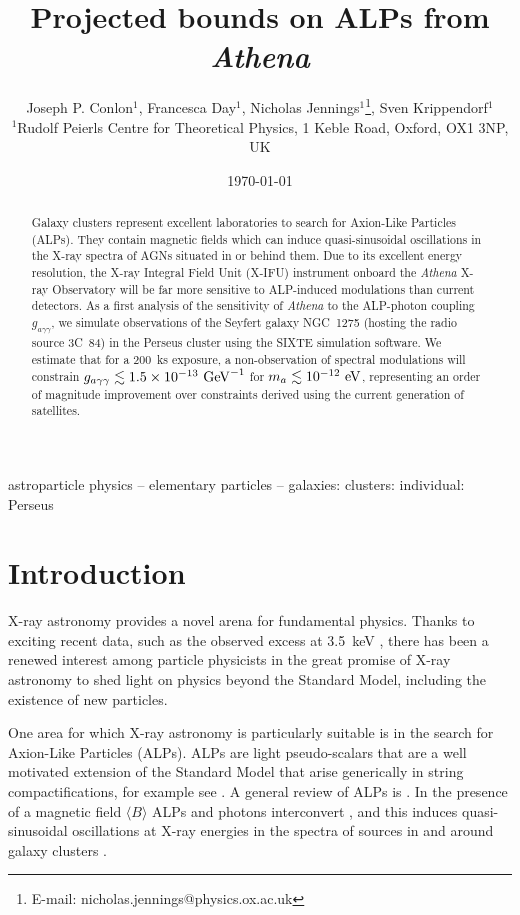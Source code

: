 \documentclass[fleqn,usenatbib,useAMS]{mnras}
\title[Projected bounds on ALPs from ATHENA]{Projected bounds on ALPs from {\it Athena}}
\author[J. P. Conlon et al.]{
Joseph P. Conlon$^{1}$,
Francesca Day$^{1}$, 
Nicholas Jennings$^{1}$\thanks{E-mail: nicholas.jennings@physics.ox.ac.uk}, 
Sven Krippendorf$^{1}$
\newauthor{ and Francesco Muia$^{1}$}
\\
$^{1}$Rudolf Peierls Centre for Theoretical Physics, 1 Keble Road, Oxford, OX1 3NP, UK\\
}
\date{\today}
\begin{document}
\label{firstpage}
\pagerange{\pageref{firstpage}--\pageref{lastpage}}
\maketitle

\begin{abstract}
Galaxy clusters represent excellent laboratories to search for Axion-Like Particles (ALPs). They contain magnetic fields which can induce quasi-sinusoidal oscillations in the X-ray spectra of AGNs situated in or behind them. Due to its excellent 
energy resolution, the X-ray Integral Field Unit (X-IFU) instrument onboard the {\it Athena} X-ray Observatory will be far more sensitive to ALP-induced modulations than current detectors. As a first analysis of the sensitivity of {\it Athena} to the ALP-photon coupling $g_{a \gamma \gamma}$, we simulate observations of the Seyfert galaxy NGC~1275 (hosting the radio source 3C~84) in the Perseus cluster using the SIXTE simulation software. We estimate that for a 200~ks exposure, a non-observation of spectral modulations will constrain ${g_{a\gamma\gamma}\lesssim1.5\times10^{-13}~\rm{GeV}^{-1}}$ for $m_a\lesssim10^{-12}~\rm{eV}$, representing an order of magnitude improvement over constraints derived  using the current generation of satellites.
\end{abstract}

\begin{keywords}
astroparticle physics -- elementary particles -- galaxies: clusters: individual: Perseus
\end{keywords}

\section{Introduction}
\label{introduction}
X-ray astronomy provides a novel arena for fundamental physics. Thanks to exciting recent data, such as the observed excess at 3.5~keV \cite{Bulbul, Boyarsky}, there has been a renewed interest among particle physicists in the great promise of X-ray astronomy to shed light on physics beyond the Standard Model, including the existence of new particles.

One area for which X-ray astronomy is particularly suitable
 is in the search for Axion-Like Particles (ALPs).
ALPs are light pseudo-scalars that are a well motivated extension of the Standard Model \cite{PecceiQuinn,Wilczek,Weinberg} that arise
 generically in string compactifications, for example see \cite{hep-th/0602233,hep-th/0605206,1206.0819}. A general review of ALPs is \cite{RingwaldReview}. In the presence of a magnetic field $\langle B \rangle$ ALPs and photons interconvert \cite{Sikivie:1983ip, Raffelt:1987im}, and this induces quasi-sinusoidal oscillations at X-ray energies in the spectra of sources in and around galaxy clusters \cite{1304.0989, 1509.06748}.
\end{document}
